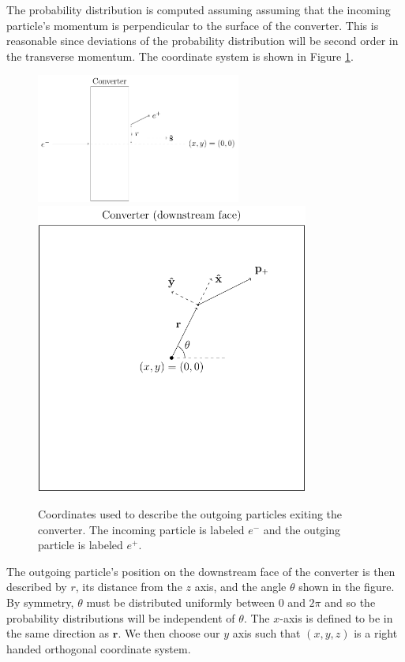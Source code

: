 \documentclass[12pt]{article}
\newcommand{\rrr}{\mathbf{r}}
\begin{document}
The probability distribution is computed assuming assuming that the incoming particle's momentum is
perpendicular to the surface of the converter. This is reasonable since deviations of the
probability distribution will be second order in the transverse momentum. The coordinate system is
shown in Figure \ref{fig:coords}.
\begin{figure}
\centering
\includegraphics[width=0.6\textwidth]{coords1.pdf}
\includegraphics[width=0.8\textwidth]{coords2.pdf}
\caption{Coordinates used to describe the outgoing particles exiting the converter. The incoming particle is
labeled $e^-$ and the outging particle is labeled $e^+$.}
\label{fig:coords}
\end{figure}
The outgoing particle's position on the downstream face of the converter is then described by $r$,
its distance from the $z$ axis, and the angle $\theta$ shown in the figure. By symmetry, $\theta$
must be distributed uniformly between $0$ and $2\pi$ and so the probability distributions will be
independent of $\theta$. The $x$-axis is defined to be in the same direction as $\rrr$. We then
choose our $y$ axis such that $(x,y,z)$ is a right handed orthogonal coordinate system.
\end{document}
